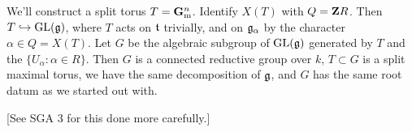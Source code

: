 We'll construct a split torus $T=\mathbf{G}_\mathrm{m}^n$. Identify $X(T)$ with $Q=\mathbf{Z} R$. Then 
$T\hookrightarrow \operatorname{GL}(\mathfrak{g})$, where $T$ acts on $\mathfrak{t}$ trivially, and on 
$\mathfrak{g}_\alpha$ by the character $\alpha\in Q=X(T)$. Let $G$ be the algebraic 
subgroup of $\operatorname{GL}(\mathfrak{g})$ generated by $T$ and the $\{U_\alpha:\alpha\in R\}$. Then 
$G$ is a connected reductive group over $k$, $T\subset G$ is a split maximal 
torus, we have the same decomposition of $\mathfrak{g}$, and $G$ has the same root 
datum as we started out with. 

[See SGA 3 for this done more carefully.]




